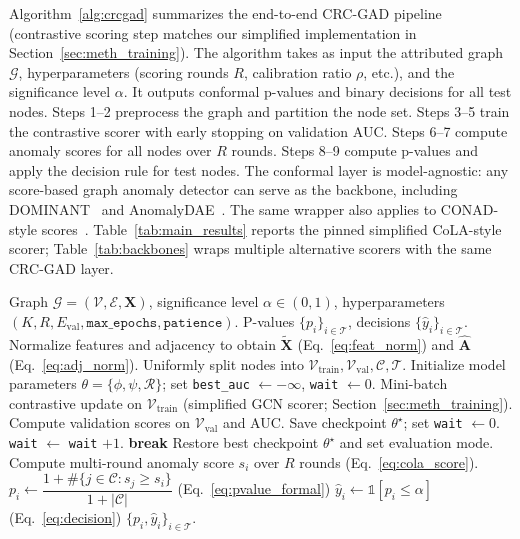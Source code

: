 \documentclass[a4paper]{cas-dc}
\theoremstyle{definition}
\begin{document}
Algorithm~\ref{alg:crcgad} summarizes the end-to-end CRC-GAD pipeline (contrastive scoring step matches our simplified implementation in Section~\ref{sec:meth_training}). The algorithm takes as input the attributed graph $\mathcal{G}$, hyperparameters (scoring rounds $R$, calibration ratio $\rho$, etc.), and the significance level $\alpha$. It outputs conformal p-values and binary decisions for all test nodes. Steps 1--2 preprocess the graph and partition the node set. Steps 3--5 train the contrastive scorer with early stopping on validation AUC. Steps 6--7 compute anomaly scores for all nodes over $R$ rounds. Steps 8--9 compute p-values and apply the decision rule for test nodes. The conformal layer is model-agnostic: any score-based graph anomaly detector can serve as the backbone, including DOMINANT~\cite{ding2019dominant} and AnomalyDAE~\cite{fan2020anomalydae}.
The same wrapper also applies to CONAD-style scores~\cite{xu2022conad}. Table~\ref{tab:main_results} reports the pinned simplified CoLA-style scorer; Table~\ref{tab:backbones} wraps multiple alternative scorers with the same CRC-GAD layer.

\begin{algorithm}[t]
\caption{CRC-GAD pipeline.}
\label{alg:crcgad}
\begin{algorithmic}[1]
\REQUIRE Graph $\mathcal{G}=(\mathcal{V},\mathcal{E},\mathbf{X})$, significance level $\alpha \in (0,1)$, hyperparameters $(K, R, E_{\text{val}}, \texttt{max\_epochs}, \texttt{patience})$.
\ENSURE P-values $\{p_i\}_{i\in\mathcal{T}}$, decisions $\{\hat{y}_i\}_{i\in\mathcal{T}}$.
\STATE Normalize features and adjacency to obtain $\tilde{\mathbf{X}}$ (Eq.~\ref{eq:feat_norm}) and $\hat{\mathbf{A}}$ (Eq.~\ref{eq:adj_norm}).
\STATE Uniformly split nodes into $\mathcal{V}_{\text{train}}, \mathcal{V}_{\text{val}}, \mathcal{C}, \mathcal{T}$.
\STATE Initialize model parameters $\theta=\{\phi,\psi,\mathcal{R}\}$; set \texttt{best\_auc} $\gets -\infty$, \texttt{wait} $\gets 0$.
    \STATE Mini-batch contrastive update on $\mathcal{V}_{\text{train}}$ (simplified GCN scorer; Section~\ref{sec:meth_training}).
        \STATE Compute validation scores on $\mathcal{V}_{\text{val}}$ and AUC.
            \STATE Save checkpoint $\theta^\star$; set \texttt{wait} $\gets 0$.
        \ELSE
            \STATE \texttt{wait} $\gets$ \texttt{wait} $+ 1$.
        \ENDIF
            \STATE \textbf{break}
        \ENDIF
    \ENDIF
\ENDFOR
\STATE Restore best checkpoint $\theta^\star$ and set evaluation mode.
    \STATE Compute multi-round anomaly score $s_i$ over $R$ rounds (Eq.~\ref{eq:cola_score}).
\ENDFOR
{}
    \STATE $p_i \gets \dfrac{1 + \#\{j \in \mathcal{C}: s_j \ge s_i\}}{1 + |\mathcal{C}|}$ \hfill (Eq.~\ref{eq:pvalue_formal})
    \STATE $\hat{y}_i \gets \mathbb{1}[p_i \le \alpha]$ \hfill (Eq.~\ref{eq:decision})
\ENDFOR
\RETURN $\{p_i, \hat{y}_i\}_{i\in\mathcal{T}}$.
\end{algorithmic}
\end{algorithm}
\end{document}
